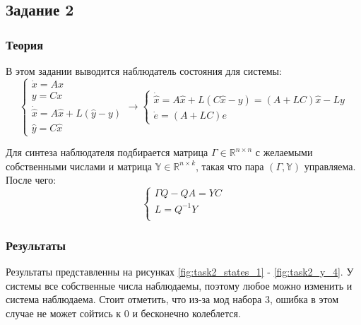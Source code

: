 \subsection{Задание 2}
\subsubsection{Теория}
В этом задании выводится наблюдатель состояния для системы:
\[
        \begin{cases}
                \dot{x} = A x \\
                y = C x \\
                \dot{\hat{x}} = A \hat{x} + L(\hat{y} - y) \\
                \hat{y} = C \hat{x}
        \end{cases} \rightarrow
        \begin{cases}
            \dot{\hat{x}} = A \hat{x} + L(C \hat{x} - y) = (A + LC )\hat{x} - Ly \\
            \dot{e} = (A + LC)e
            
    \end{cases}
\]

Для синтеза наблюдателя подбирается матрица \(\Gamma \in \mathds{R}^{n \times n}\) с желаемыми собственными числами и матрица \(\mathds{Y} \in \mathds{R}^{n \times k}\), такая что пара \((\Gamma, \mathds{Y})\) управляема. После чего:
\[
    \begin{cases}
        \Gamma Q - QA = YC \\
        L = Q^{-1}Y \\
    \end{cases}
\]




\subsubsection{Результаты}
Результаты представленны на рисунках \ref{fig:task2_states_1} - \ref{fig:task2_y_4}. У системы все собственные числа наблюдаемы, поэтому любое можно изменить и система наблюдаема. Стоит отметить, что из-за мод набора 3, ошибка в этом случае не может сойтись к 0 и бесконечно колеблется.


